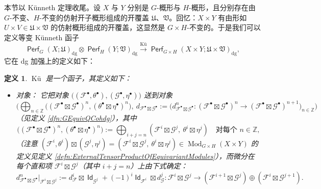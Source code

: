 \documentclass[11pt,a4paper]{article}
\DeclareMathOperator{\id}{\mathsf{Id}}
\DeclareMathOperator{\Mod}{\mathrm{Mod}}
\DeclareMathOperator{\Perf}{\mathsf{Perf}}
\DeclareMathOperator{\dg}{\operatorname{dg}}
\DeclareMathOperator{\Ku}{\textrm{Kü}}
\theoremstyle{cnth}
\newtheorem{defn}[thm]{定义}
\begin{document}
本节以 Künneth 定理收尾。设 $X$ 与 $Y$ 分别是 $G$-概形与 $H$-概形，且分别存在由 $G$-不变、$H$-不变的仿射开子概形组成的开覆盖 $\mathfrak{U}$、$\mathfrak{V}$。回忆：$X\times Y$ 有由形如 $U\times V\in\mathfrak{U}\times\mathfrak{V}$ 的仿射概形组成的开覆盖，这显然是 $G\times H$-不变的。于是我们可以定义等变 Künneth 函子
$$
\Perf_G(X;\mathfrak{U})_{\dg}
\otimes
\Perf_H(Y;\mathfrak{V})_{\dg}
\xrightarrow{\Ku}
\Perf_{G\times H}(X\times Y;\mathfrak{U}\times\mathfrak{V})_{\dg},
$$
它在 dg 加强上的定义如下：
\begin{defn}
$\Ku$ 是一个函子，其定义如下：
\begin{itemize}
\item
对象：
它把对象
$
\big((\mathcal{F}^{\bullet},\theta^{\bullet}),(\mathcal{G}^{\bullet},\eta^{\bullet})\big)
$
送到对象
$$
\Big(
\bigoplus_{n\in\mathbb{Z}}
\big(
(\mathcal{F}^{\bullet}\boxtimes\mathcal{G}^{\bullet})^n,
(\theta^{\bullet}\boxtimes\eta^{\bullet})^n
\big),
\
d_{\mathcal{F}^{\bullet}\boxtimes\mathcal{G}^{\bullet}}
:=
\big(
d_{\mathcal{F}^{\bullet}\boxtimes\mathcal{G}^{\bullet}}^n
:
(\mathcal{F}^{\bullet}\boxtimes\mathcal{G}^{\bullet})^n
\rightarrow
(\mathcal{F}^{\bullet}\boxtimes\mathcal{G}^{\bullet})^{n+1}
\big)_{n\in\mathbb{Z}}
\Big)
$$
（见定义 \ref{dfn:GEquivQCohdg}），其中
$$
\big(
(\mathcal{F}^{\bullet}\boxtimes\mathcal{G}^{\bullet})^n,
(\theta^{\bullet}\boxtimes\eta^{\bullet})^n
\big)
:=
\bigoplus_{i+j=n}
(
\mathcal{F}^i\boxtimes\mathcal{G}^j,
\
\theta^i\boxtimes\eta^j
)
\quad\text{对每个 }n\in\mathbb{Z},
$$
（注意 $
(\mathcal{F}^i,\theta^i)
\boxtimes
(\mathcal{G}^j,\eta^j)
=
(
\mathcal{F}^i\boxtimes\mathcal{G}^j,
\
\theta^i\boxtimes\eta^j
)
\in\Mod_{G\times H}(X\times Y)
$
的定义见定义 \ref{defn:ExternalTensorProductOfEquivariantModules}），而微分在每个直和项 $\mathcal{F}^i\boxtimes\mathcal{G}^j$（其中 $i+j=n$）上由下式确定：
\[
d_{\mathcal F^\bullet\boxtimes\mathcal G^\bullet}^n
\big|_{\mathcal F^i\boxtimes\mathcal G^j}
:=
d_{\mathcal F}^i\boxtimes\id_{\mathcal G^j}
+
(-1)^i\id_{\mathcal F^i}\boxtimes d_{\mathcal G}^j
:
\mathcal{F}^i\boxtimes\mathcal{G}^j
\rightarrow
(\mathcal{F}^{i+1}\boxtimes\mathcal{G}^j)
\oplus
(\mathcal{F}^i\boxtimes\mathcal{G}^{j+1}).
\]


\end{itemize}
\end{defn}
\end{document}
